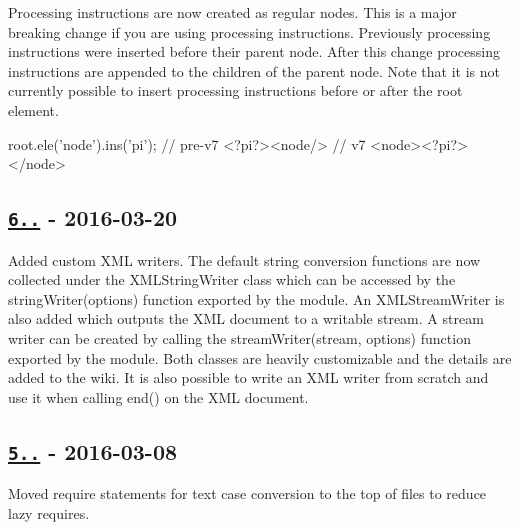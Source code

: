 \begin{DoxyItemize}
\item Processing instructions are now created as regular nodes. This is a major breaking change if you are using processing instructions. Previously processing instructions were inserted before their parent node. After this change processing instructions are appended to the children of the parent node. Note that it is not currently possible to insert processing instructions before or after the root element. 
\begin{DoxyCode}
root.ele('node').ins('pi');
// pre-v7
<?pi?><node/>
// v7
<node><?pi?></node>
\end{DoxyCode}

\end{DoxyItemize}

\subsection*{\href{https://github.com/oozcitak/xmlbuilder-js/compare/v5.0.1...v6.0.0}{\tt 6..} -\/ 2016-\/03-\/20}


\begin{DoxyItemize}
\item Added custom X\+ML writers. The default string conversion functions are now collected under the {\ttfamily X\+M\+L\+String\+Writer} class which can be accessed by the {\ttfamily string\+Writer(options)} function exported by the module. An {\ttfamily X\+M\+L\+Stream\+Writer} is also added which outputs the X\+ML document to a writable stream. A stream writer can be created by calling the {\ttfamily stream\+Writer(stream, options)} function exported by the module. Both classes are heavily customizable and the details are added to the wiki. It is also possible to write an X\+ML writer from scratch and use it when calling {\ttfamily end()} on the X\+ML document.
\end{DoxyItemize}

\subsection*{\href{https://github.com/oozcitak/xmlbuilder-js/compare/v5.0.0...v5.0.1}{\tt 5..} -\/ 2016-\/03-\/08}


\begin{DoxyItemize}
\item Moved require statements for text case conversion to the top of files to reduce lazy requires.
\end{DoxyItemize}

